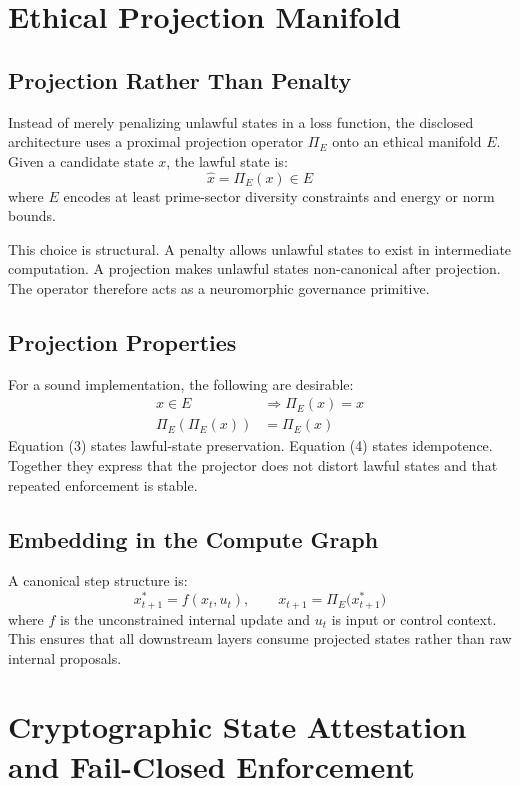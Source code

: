 \documentclass[11pt]{article}
\begin{document}
\section{Ethical Projection Manifold}
\subsection{Projection Rather Than Penalty}
Instead of merely penalizing unlawful states in a loss function, the disclosed architecture uses a proximal projection operator \(\Pi_E\) onto an ethical manifold \(E\). Given a candidate state \(x\), the lawful state is:
\[
\hat{x} = \Pi_E(x) \in E \tag{2}
\]
where \(E\) encodes at least prime-sector diversity constraints and energy or norm bounds.

This choice is structural. A penalty allows unlawful states to exist in intermediate computation. A projection makes unlawful states non-canonical after projection. The operator therefore acts as a neuromorphic governance primitive.

\subsection{Projection Properties}
For a sound implementation, the following are desirable:
\begin{align}
x \in E &\Rightarrow \Pi_E(x) = x \tag{3}\\
\Pi_E(\Pi_E(x)) &= \Pi_E(x) \tag{4}
\end{align}
Equation (3) states lawful-state preservation. Equation (4) states idempotence. Together they express that the projector does not distort lawful states and that repeated enforcement is stable.

\subsection{Embedding in the Compute Graph}
A canonical step structure is:
\[
x_{t+1}^{\ast} = f(x_t, u_t), \qquad x_{t+1} = \Pi_E\big(x_{t+1}^{\ast}\big) \tag{5}
\]
where \(f\) is the unconstrained internal update and \(u_t\) is input or control context. This ensures that all downstream layers consume projected states rather than raw internal proposals.

\section{Cryptographic State Attestation and Fail-Closed Enforcement}
\end{document}
